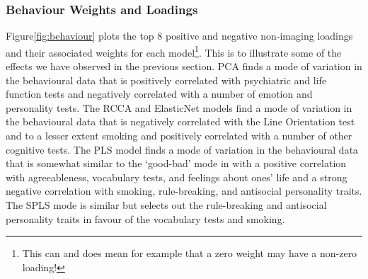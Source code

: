\subsubsection{Behaviour Weights and Loadings}

Figure\ref{fig:behaviour} plots the top 8 positive and negative non-imaging loadings and their associated weights for each model\footnote{This can and does mean for example that a zero weight may have a non-zero loading!}.
This is to illustrate some of the effects we have observed in the previous section.
PCA finds a mode of variation in the behavioural data that is positively correlated with psychiatric and life function tests and negatively correlated with a number of emotion and personality tests.
The RCCA and ElasticNet models find a mode of variation in the behavioural data that is negatively correlated with the Line Orientation test and to a lesser extent smoking and positively correlated with a number of other cognitive tests.
The PLS model finds a mode of variation in the behavioural data that is somewhat similar to the `good-bad' mode in\cite{smith2015positive} with a positive correlation with agreeableness, vocabulary tests, and feelings about ones' life and a strong negative correlation with smoking, rule-breaking, and antisocial personality traits.
The SPLS mode is similar but selects out the rule-breaking and antisocial personality traits in favour of the vocabulary tests and smoking.

